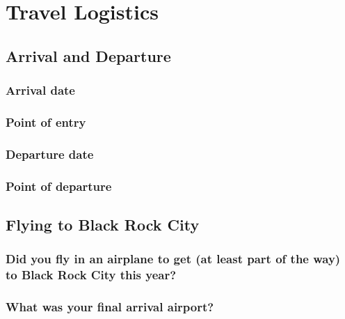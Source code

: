 \documentclass[
]{book}
\begin{document}
\hypertarget{travel-logistics}{%
\chapter{Travel Logistics}\label{travel-logistics}}

\hypertarget{arrival-and-departure}{%
\section{Arrival and Departure}\label{arrival-and-departure}}

\hypertarget{arrival-date}{%
\subsection{Arrival date}\label{arrival-date}}

\hypertarget{point-of-entry}{%
\subsection{Point of entry}\label{point-of-entry}}

\hypertarget{departure-date}{%
\subsection{Departure date}\label{departure-date}}

\hypertarget{point-of-departure}{%
\subsection{Point of departure}\label{point-of-departure}}

\hypertarget{flying-to-black-rock-city}{%
\section{Flying to Black Rock City}\label{flying-to-black-rock-city}}

\hypertarget{did-you-fly-in-an-airplane-to-get-at-least-part-of-the-way-to-black-rock-city-this-year}{%
\subsection{Did you fly in an airplane to get (at least part of the way) to Black Rock City this year?}\label{did-you-fly-in-an-airplane-to-get-at-least-part-of-the-way-to-black-rock-city-this-year}}

\hypertarget{what-was-your-final-arrival-airport}{%
\subsection{What was your final arrival airport?}\label{what-was-your-final-arrival-airport}}
\end{document}
